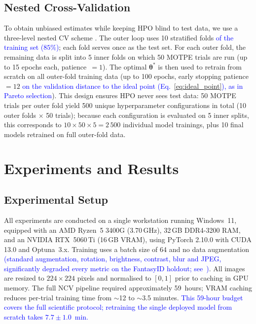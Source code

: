 \documentclass[final,5p,times,twocolumn,number]{elsarticle}
\newcommand{\rev}[1]{\textcolor{blue}{#1}}
\begin{document}
\subsection{Nested Cross-Validation}
\label{subsec:ncv}

To obtain unbiased estimates while keeping HPO blind to test data, we use a
three-level nested CV scheme \citep{varma2006bias}. The outer loop uses 10
stratified folds \rev{of the training set ($85\%$)}; each fold serves once as
the test set. For each outer fold,
the remaining data is split into 5 inner folds on which 50 MOTPE trials are
run (up to 15 epochs each, patience~$=1$). The optimal $\boldsymbol{\theta}^*$
is then used to retrain from scratch on all outer-fold training data (up to 100
epochs, early stopping patience~$=12$ \rev{on the validation distance to the
ideal point (Eq.~\ref{eq:ideal_point}), as in Pareto selection}). This design ensures HPO never sees test data: 50 MOTPE trials per outer fold
yield 500 unique hyperparameter configurations in total (10 outer
folds $\times$ 50 trials); because each configuration is evaluated on 5 inner
splits, this corresponds to $10 \times 50 \times 5 = 2\,500$ individual model
trainings, plus 10 final models retrained on full outer-fold data.


\section{Experiments and Results}
\label{sec:experiments}

\subsection{Experimental Setup}
\label{subsec:setup}

All experiments are conducted on a single workstation running Windows~11,
equipped with an AMD Ryzen~5 3400G (3.70\,GHz), 32\,GB DDR4-3200 RAM, and an NVIDIA
RTX~5060\,Ti (16\,GB VRAM), using PyTorch 2.10.0 with CUDA 13.0 and
Optuna~3.x. Training uses a batch size of 64 and no data augmentation
\rev{(standard augmentation, rotation, brightness, contrast, blur and JPEG,
significantly degraded every metric on the FantasyID holdout;
see~\citep{docverify_zenodo})}.
All images are resized to $224\!\times\!224$ pixels and normalised to
$[0,1]$ prior to caching in GPU memory.
The full NCV pipeline required
approximately 59~hours; VRAM caching reduces per-trial training time from
$\sim$12 to $\sim$3.5 minutes. \rev{This 59-hour budget covers the full
scientific protocol; retraining the single deployed model from scratch takes
$7.7 \pm 1.0$~min.}
\end{document}

